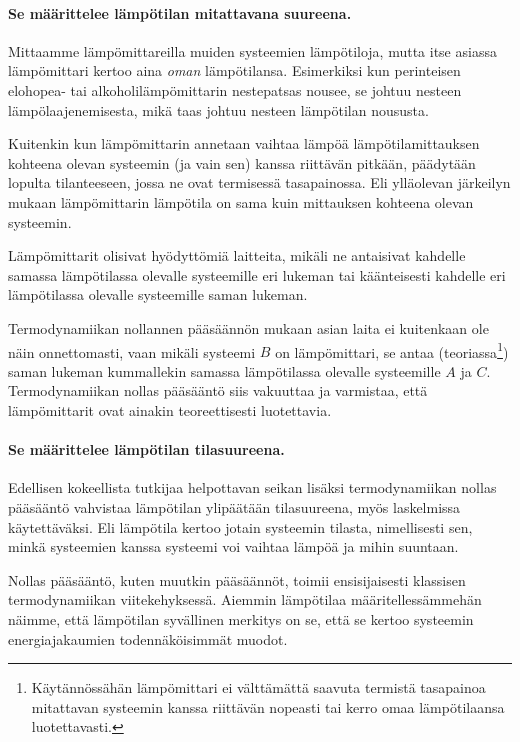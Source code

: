 \documentclass[12pt,a4paper,finnish]{book}
\begin{document}
\paragraph{Se määrittelee lämpötilan mitattavana suureena.}

Mittaamme lämpömittareilla muiden systeemien lämpötiloja, mutta itse asiassa lämpömittari kertoo aina 
\textit{oman} lämpötilansa. Esimerkiksi kun perinteisen elohopea- tai alkoholilämpömittarin nestepatsas 
nousee, se johtuu nesteen lämpölaajenemisesta, mikä taas johtuu nesteen lämpötilan noususta.

Kuitenkin kun lämpömittarin annetaan vaihtaa lämpöä lämpötilamittauksen kohteena olevan systeemin (ja 
vain sen) kanssa riittävän pitkään, päädytään lopulta tilanteeseen, jossa ne ovat termisessä tasapainossa. 
Eli ylläolevan järkeilyn mukaan lämpömittarin lämpötila on sama kuin mittauksen kohteena olevan systeemin.

Lämpömittarit olisivat hyödyttömiä laitteita, mikäli ne antaisivat kahdelle samassa lämpötilassa olevalle 
systeemille eri lukeman tai käänteisesti kahdelle eri lämpötilassa olevalle systeemille saman lukeman. 

Termodynamiikan nollannen pääsäännön mukaan asian laita ei kuitenkaan ole näin onnettomasti, vaan mikäli 
systeemi $B$ on lämpömittari, se antaa (teoriassa\footnote{Käytännössähän lämpömittari ei välttämättä 
saavuta termistä tasapainoa mitattavan systeemin kanssa riittävän nopeasti tai kerro omaa lämpötilaansa 
luotettavasti.}) saman lukeman kummallekin samassa lämpötilassa olevalle systeemille $A$ ja $C$. 
Termodynamiikan nollas pääsääntö siis vakuuttaa ja varmistaa, että lämpömittarit ovat ainakin teoreettisesti 
luotettavia. 

\paragraph{Se määrittelee lämpötilan tilasuureena.}

Edellisen kokeellista tutkijaa helpottavan seikan lisäksi termodynamiikan nollas pääsääntö vahvistaa lämpötilan 
ylipäätään tilasuureena, myös laskelmissa käytettäväksi. Eli lämpötila kertoo jotain systeemin tilasta, 
nimellisesti sen, minkä systeemien kanssa systeemi voi vaihtaa lämpöä ja mihin suuntaan.

Nollas pääsääntö, kuten muutkin pääsäännöt, toimii ensisijaisesti klassisen termodynamiikan viitekehyksessä. 
Aiemmin lämpötilaa määritellessämmehän näimme, että lämpötilan syvällinen merkitys on se, että se kertoo 
systeemin energiajakaumien todennäköisimmät muodot.
\end{document}
